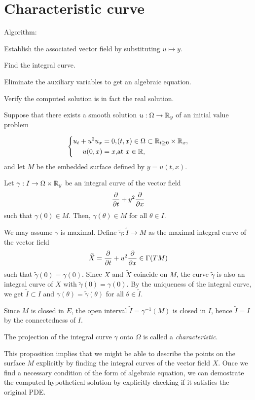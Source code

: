 \documentclass[12pt]{article}
\begin{document}
\section{Characteristic curve}
Algorithm:
\begin{parts}
\item Establish the associated vector field by substituting $u\mapsto y$.
\item Find the integral curve.
\item Eliminate the auxiliary variables to get an algebraic equation.
\item Verify the computed solution is in fact the real solution.
\end{parts}
\begin{prop}
Suppose that there exists a smooth solution $u:\Omega\to\mathbb{R}_y$ of an initial value problem

\[\left\{\begin{alignedat}{2}
u_t+u^2u_x&=0, && (t,x)\in\Omega\subset\mathbb{R}_{t\ge0}\times\mathbb{R}_x,\\
u(0,x)&=x, && \text{at}\ x\in\mathbb{R},
\end{alignedat}\right.\]
and let $M$ be the embedded surface defined by $y=u(t,x)$.

Let $\gamma:I\to\Omega\times\mathbb{R}_y$ be an integral curve of the vector field
\[\pd{t}+y^2\pd{x}\]
such that $\gamma(0)\in M$.
Then, $\gamma(\theta)\in M$ for all $\theta\in I$.
\end{prop}
\begin{pf}
We may assume $\gamma$ is maximal.
Define $\tilde\gamma:\tilde I\to M$ as the maximal integral curve of the vector field
\[\tilde X=\pd{t}+u^2\pd{x}\in\Gamma(TM)\]
such that $\tilde\gamma(0)=\gamma(0)$.
Since $X$ and $\tilde X$ coincide on $M$, the curve $\tilde\gamma$ is also an integral curve of $X$ with $\tilde\gamma(0)=\gamma(0)$.
By the uniqueness of the integral curve, we get $\tilde I\subset I$ and $\gamma(\theta)=\tilde\gamma(\theta)$ for all $\theta\in\tilde I$.

Since $M$ is closed in $E$, the open interval $\tilde I=\gamma^{-1}(M)$ is closed in $I$, hence $\tilde I=I$ by the connectedness of $I$.
\end{pf}
\begin{defn}
The projection of the integral curve $\gamma$ onto $\Omega$ is called a \emph{characteristic}.
\end{defn}
This proposition implies that we might be able to describe the points on the surface $M$ explicitly by finding the integral curves of the vector field $X$.
Once we find a necessary condition of the form of algebraic equation, we can demostrate the computed hypothetical solution by explicitly checking if it satisfies the original PDE.
\end{document}
